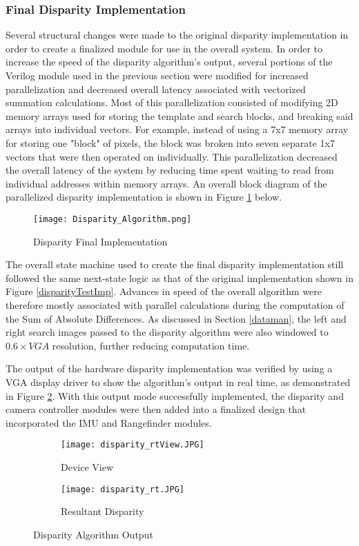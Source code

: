 \subsubsection{Final Disparity Implementation}
Several structural changes were made to the original disparity implementation in order to create a finalized module for use in the overall system. In order to increase the speed of the disparity algorithm's output, several portions of the Verilog module used in the previous section were modified for increased parallelization and decreased overall latency associated with vectorized summation calculations. Most of this parallelization consisted of modifying 2D memory arrays used for storing the template and search blocks, and breaking said arrays into individual vectors. For example, instead of using a 7x7 memory array for storing one "block" of pixels, the block was broken into seven separate 1x7 vectors that were then operated on individually. This parallelization decreased the overall latency of the system by reducing time spent waiting to read from individual addresses within memory arrays. An overall block diagram of the parallelized disparity implementation is shown in Figure \ref{disparityFinalImp} below. 
\par
\begin{figure}[H]
	\centerline{\texttt{[image: Disparity\_Algorithm.png]}}
	\caption{Disparity Final Implementation}
	\label{disparityFinalImp}
\end{figure}
\par
The overall state machine used to create the final disparity implementation still followed the same next-state logic as that of the original implementation shown in Figure \ref{disparityTestImp}. Advances in speed of the overall algorithm were therefore mostly associated with parallel calculations during the computation of the Sum of Absolute Differences. As discussed in Section \ref{dataman}, the left and right search images passed to the disparity algorithm were also windowed to $0.6\times{}VGA$ resolution, further reducing computation time. 
\par
The output of the hardware disparity implementation was verified by using a VGA display driver to show the algorithm's output in real time, as demonstrated in Figure \ref{disparityFin}. With this output mode successfully implemented, the disparity and camera controller modules were then added into a finalized design that incorporated the IMU and Rangefinder modules.
\par
\begin{figure}[H] 
	\begin{subfigure}{0.5\textwidth}
	\centering
		\texttt{[image: disparity\_rtView.JPG]}
		\caption{Device View}
	\end{subfigure}
	\begin{subfigure}{0.5\textwidth}
	\centering
		\texttt{[image: disparity\_rt.JPG]}
		\caption{Resultant Disparity}
	\end{subfigure}
	\caption{Disparity Algorithm Output}
	\label{disparityFin}
\end{figure}